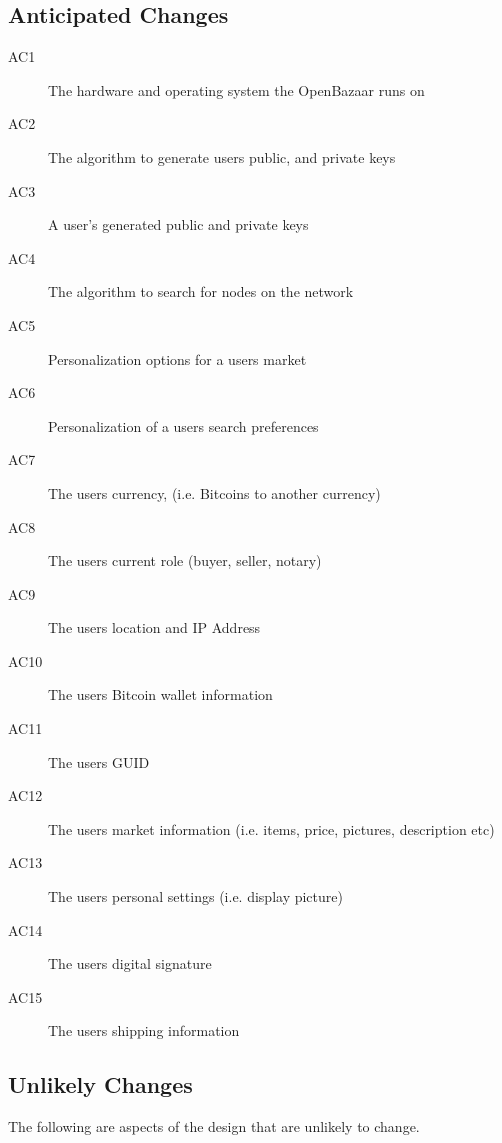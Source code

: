 \documentclass{article}
\begin{document}
\subsection{Anticipated Changes} %
\begin{description}
	\item[AC1]
	The hardware and operating system the OpenBazaar runs on
	\item[AC2]
	The algorithm to generate users public, and private keys	
	\item[AC3]
	A user's generated public and private keys
	\item[AC4]
	The algorithm to search for nodes on the network
	\item[AC5]
	Personalization options for a users market
	\item[AC6]
	Personalization of a users search preferences
	\item[AC7]
	The users currency, (i.e. Bitcoins to another currency)
	\item[AC8]
	The users current role (buyer, seller, notary)
	\item[AC9]
	The users location and IP Address
	\item[AC10]
	The users Bitcoin wallet information
	\item[AC11]
	The users GUID
	\item[AC12]
	The users market information (i.e. items, price, pictures, description etc)
	\item[AC13]
	The users personal settings (i.e. display picture)
	\item[AC14]
	The users digital signature
	\item[AC15]
	The users shipping information
\end{description}

\subsection{Unlikely Changes}

The following are aspects of the design that are unlikely to change.
\end{document}
